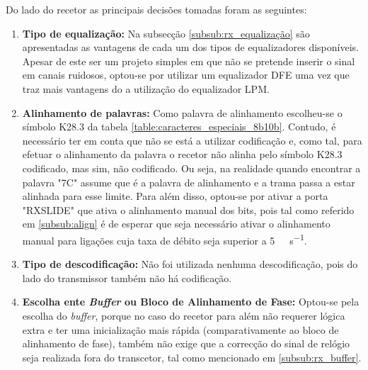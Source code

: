 Do lado do recetor as principais decisões tomadas foram as seguintes:
\begin{enumerate}
	\item \textbf{Tipo de equalização:} Na subsecção \ref{subsub:rx_equalização} são apresentadas as vantagens de cada um dos tipos de equalizadores disponíveis. Apesar de este ser um projeto simples em que não se pretende inserir o sinal em canais ruidosos, optou-se por utilizar um equalizador DFE uma vez que traz mais vantagens do a utilização do equalizador LPM.
	
	\item \textbf{Alinhamento de palavras:} Como palavra de alinhamento escolheu-se o símbolo K28.3 da tabela \ref{table:caracteres_especiais_8b10b}. Contudo, é necessário ter em conta que não se está a utilizar codificação e, como tal, para efetuar o alinhamento da palavra o recetor não alinha pelo símbolo K28.3 codificado, mas sim, não codificado. Ou seja, na realidade quando encontrar a palavra "7C" assume que é a palavra de alinhamento e a trama passa a estar alinhada para esse limite. Para além disso, optou-se por ativar a porta "RXSLIDE" que ativa o alinhamento manual dos bits, pois tal como referido em \ref{subsub:align} é de esperar que seja necessário ativar o alinhamento manual para ligações cuja taxa de débito seja superior a \SI{5}{\giga\bit\per\second}.
	
	\item \textbf{Tipo de descodificação:} Não foi utilizada nenhuma descodificação, pois do lado do transmissor também não há codificação.
	\item \textbf{Escolha ente \textit{Buffer} ou Bloco de Alinhamento de Fase:} Optou-se pela escolha do \textit{buffer}, porque no caso do recetor para além não requerer lógica extra e ter uma inicialização mais rápida (comparativamente ao bloco de alinhamento de fase), também não exige que a correcção do sinal de relógio seja realizada fora do transcetor, tal como mencionado em \ref{subsub:rx_buffer}.
\end{enumerate}

